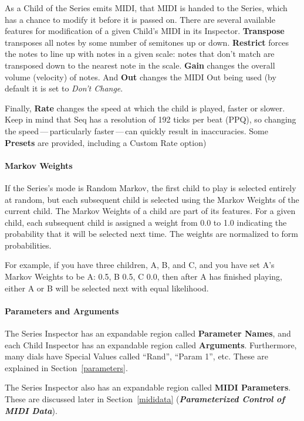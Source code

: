 \documentclass[twoside,10pt]{article}
\begin{document}
As a Child of the Series emits MIDI, that MIDI is handed to the Series, which has a chance to modify it before it is passed on.  There are several available features for modification of a given Child's MIDI in its Inspector.  {\bf Transpose} transposes all notes by some number of semitones up or down.  {\bf Restrict} forces the notes to line up with notes in a given scale: notes that don't match are transposed down to the nearest note in the scale.  {\bf Gain} changes the overall volume (velocity) of notes.  And {\bf Out} changes the MIDI Out being used (by default it is set to {\it Don't Change}.

Finally, {\bf Rate} changes the speed at which the child is played, faster or slower.  Keep in mind that Seq has a resolution of 192 ticks per beat (PPQ), so changing the speed\,---\,particularly faster\,---\,can quickly result in inaccuracies.  Some {\bf Presets} are provided, including a Custom Rate option)

\paragraph{Markov Weights}

If the Series's mode is Random Markov, the first child to play is selected entirely at random, but each subsequent child is selected using the Markov Weights of the current child.  The Markov Weights of a child are part of its features.  For a given child, each subsequent child is assigned a weight from 0.0 to 1.0 indicating the probability that it will be selected next time.  The weights are normalized to form probabilities.

For example, if you have three children, A, B, and C, and you have set A's Markov Weights to be A: 0.5, B 0.5, C 0.0, then after A has finished playing, either A or B will be selected next with equal likelihood.

\paragraph{Parameters and Arguments}

The Series Inspector has an expandable region called {\bf Parameter Names}, and each Child Inspector has an expandable region called {\bf Arguments}. Furthermore, many dials have Special Values called ``Rand'', ``Param 1'', etc.  These are explained in Section~\ref{parameters}.

The Series Inspector also has an expandable region called {\bf MIDI Parameters}.  These are discussed later in Section~\ref{mididata} (\textbf{\textit{Parameterized Control of MIDI Data}}).
\end{document}

